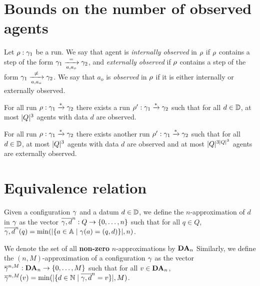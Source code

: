\documentclass[a4paper,UKenglish,cleveref, autoref, thm-restate]{lipics-v2021}
\newcommand{\corto}[1]{\todo[color=blue!20]{\small #1}}
\begin{document}
	\section{Bounds on the number of observed agents}
	
		\begin{definition}
		Let $\run : \config_1$ be a run.
		We say that agent is \emph{internally observed} in $\run$ if $\run$ contains a step of the form $\config_1 \step{=}{a}{a_o} \config_2$, and \emph{externally observed} if $\run$ contains a step of the form $\config_1 \step{\neq}{a}{a_o} \config_2$.
		We say that $a_o$ is \emph{observed} in $\run$ if it is either internally or externally observed.
	\end{definition}
	
	
	\begin{lemma}
		For all run $\run : \config_1 \xrightarrow{*} \config_2$ there exists a run $\run' : \config_1 \xrightarrow{*} \config_2$ such that for all $d \in \Dataset$, at most $\size{Q}^3$ agents with data $d$ are observed.
	\end{lemma}
	

	
	\begin{lemma}
		For all run $\run : \config_1 \xrightarrow{*} \config_2$ there exists another run $\run' : \config_1 \xrightarrow{*} \config_2$ such that for all $d \in \Dataset$, at most $\size{Q}^3$ agents with data $d$ are observed and at most $\size{Q}^{3\size{Q}^3}$\corto{Tentative bound} agents are externally observed.
	\end{lemma}
	 
	
	\section{Equivalence relation}
	
	Given a configuration $\config$ and a datum $d \in \Dataset$, we define the $n$-approximation of $d$ in $\config$ as the vector $\dataapprox{n}{\config}{d} : Q \to \nset{0}{n}$ such that for all $q\in Q$, $\dataapprox{n}{\config}{d}(q)=\min(\size{\set{a \in \Agentset \mid \config(a)= (q,d)}},n)$.
	
	We denote the set of all \textbf{non-zero} $n$-approximations by $\DataApproxSet{n}$
	Similarly, we define the $(n,M)$-approximation of a configuration $\config$ as the vector $\configapprox{n}{M}{\config} : \DataApproxSet{n} \to \nset{0}{M}$ such that for all $v\in \DataApproxSet{n}$,
	$\configapprox{n}{M}{\config}(v) = \min(\size{\set{d \in \nats \mid \dataapprox{n}{\config}{d} = v}},M)$.
	
\end{document}
